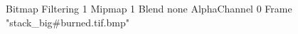 {Bitmap
	{Filtering 1}
	{Mipmap 1}
	{Blend none}
	{AlphaChannel 0}
	{Frame "stack_big#burned.tif.bmp"}
}
